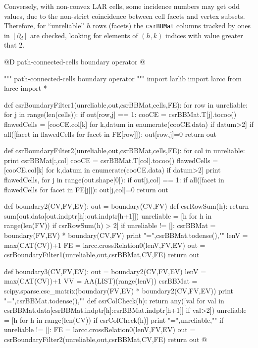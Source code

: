 \documentclass[11pt,oneside]{article}	%
\begin{document}
Conversely, with non-convex LAR cells, some incidence numbers may get odd values, due to the non-strict coincidence between cell facets and vertex subsets.
Therefore, for ``unreliable'' $h$ rows (facets) the \texttt{csrBBMat} columns tracked by ones in $[\partial_d]$ are checked, looking for elements of $(h,k)$ indices with value greater that 2.

@D path-connected-cells boundary operator
@{""" path-connected-cells boundary operator """
import larlib
import larcc
from larcc import *

def csrBoundaryFilter1(unreliable,out,csrBBMat,cells,FE):
    for row in unreliable:
        for j in range(len(cells)):
            if out[row,j] == 1:
                cooCE = csrBBMat.T[j].tocoo()
                flawedCells = [cooCE.col[k] for k,datum in enumerate(cooCE.data)
                    if datum>2]
                if all([facet in flawedCells  for facet in FE[row]]):
                    out[row,j]=0
    return out

def csrBoundaryFilter2(unreliable,out,csrBBMat,cells,FE):
    for col in unreliable:
        print csrBBMat[:,col]
        cooCE = csrBBMat.T[col].tocoo()
        flawedCells = [cooCE.col[k] for k,datum in enumerate(cooCE.data)
                    if datum>2]
        print  flawedCells,
        for j in range(out.shape[0]):
            if out[j,col] == 1:
                if all([facet in flawedCells  for facet in FE[j]]):
                    out[j,col]=0
    return out

def boundary2(CV,FV,EV):
    out = boundary(CV,FV)
    def csrRowSum(h): 
        return sum(out.data[out.indptr[h]:out.indptr[h+1]])    
    unreliable = [h for h in range(len(FV)) if csrRowSum(h) > 2]
    if unreliable != []:
        csrBBMat = boundary(FV,EV) * boundary(CV,FV)
        print "\ncsrBBMat =",csrBBMat.todense(),"\n"
        lenV = max(CAT(CV))+1
        FE = larcc.crossRelation0(lenV,FV,EV)
        out = csrBoundaryFilter1(unreliable,out,csrBBMat,CV,FE)
    return out

def boundary3(CV,FV,EV):
    out = boundary2(CV,FV,EV)
    lenV = max(CAT(CV))+1
    VV = AA(LIST)(range(lenV))
    csrBBMat = scipy.sparse.csc_matrix(boundary(FV,EV) * boundary2(CV,FV,EV))
    print "\ncsrBBMat =",csrBBMat.todense(),"\n"
    def csrColCheck(h): 
        return any([val for val in csrBBMat.data[csrBBMat.indptr[h]:csrBBMat.indptr[h+1]] if val>2])    
    unreliable = [h for h in range(len(CV)) if csrColCheck(h)]
    print "\nunreliable =",unreliable,"\n"
    if unreliable != []:
        FE = larcc.crossRelation0(lenV,FV,EV)
        out = csrBoundaryFilter2(unreliable,out,csrBBMat,CV,FE)
    return out
@}
\end{document}
